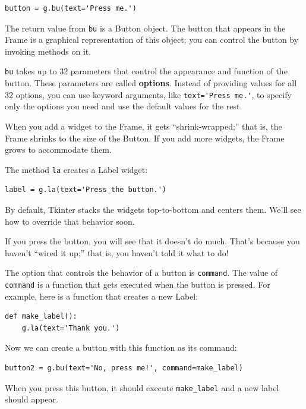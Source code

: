 \documentclass[10pt]{book}
\begin{document}
\beforeverb
\begin{verbatim}
button = g.bu(text='Press me.')
\end{verbatim}
\afterverb
%
The return value from {\tt bu} is a Button object.  The button
that appears in the Frame is a graphical representation of this
object; you can control the button by invoking methods on it.


{\tt bu} takes up to 32 parameters that control the appearance
and function of the button.  These parameters are called
{\bf options}.  Instead of providing values for all 32 options,
you can use keyword arguments, like \verb"text='Press me.'",
to specify only the options you need and use the default
values for the rest.


When you add a widget to the Frame, it gets ``shrink-wrapped;''
that is, the Frame shrinks to the size of the Button.  If you
add more widgets, the Frame grows to accommodate them.


The method {\tt la} creates a Label widget:

\beforeverb
\begin{verbatim}
label = g.la(text='Press the button.')
\end{verbatim}
\afterverb
%
By default, Tkinter stacks the widgets top-to-bottom and centers
them.  We'll see how to override that behavior soon.

If you press the button, you will see that it doesn't do much.
That's because you haven't ``wired it up;'' that is, you haven't
told it what to do!

The option that controls the behavior of a button is {\tt command}.
The value of {\tt command} is a function that gets executed when
the button is pressed.  For example, here is a function that creates
a new Label:

\beforeverb
\begin{verbatim}
def make_label():
    g.la(text='Thank you.')
\end{verbatim}
\afterverb
%
Now we can create a button with this function as its command:

\beforeverb
\begin{verbatim}
button2 = g.bu(text='No, press me!', command=make_label)
\end{verbatim}
\afterverb
%
When you press this button, it should execute \verb"make_label"
and a new label should appear.
\end{document}
